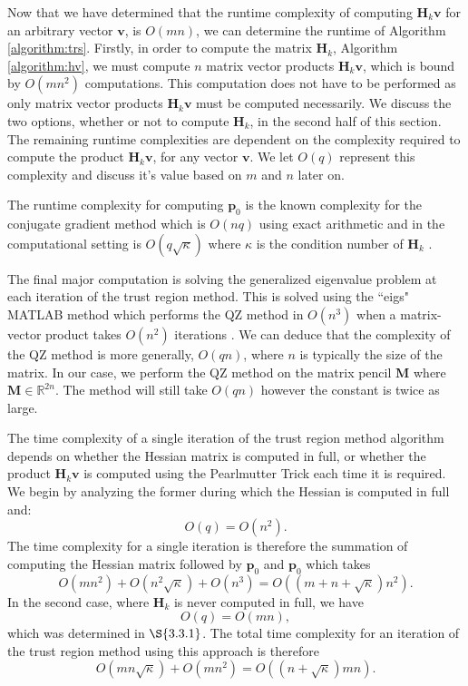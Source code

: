 \documentclass[letterpaper,12pt,titlepage,oneside,final]{book}
\begin{document}
	Now that we have determined that the runtime complexity of computing $\mathbf{H}_{k}\mathbf{v}$ for an arbitrary vector $\mathbf{v}$, is $O(mn)$, we can determine the runtime of Algorithm \ref{algorithm:trs}. Firstly, in order to compute the matrix $\mathbf{H}_{k}$, Algorithm \ref{algorithm:hv}, we must compute $n$ matrix vector products $\mathbf{H}_{k}\mathbf{v}$, which is bound by $O(mn^{2})$ computations. This computation does not have to be performed as only matrix vector products $\mathbf{H}_{k}\mathbf{v}$ must be computed necessarily. We discuss the two options, whether or not to compute $\mathbf{H}_{k}$, in the second half of this section. The remaining runtime complexities are dependent on the complexity required to compute the product $\mathbf{H}_{k}\mathbf{v}$, for any vector $\mathbf{v}$. We let $O(q)$ represent this complexity and discuss it's value based on $m$ and $n$ later on.
	
	The runtime complexity for computing $\mathbf{p}_{0}$ 
	is the known complexity for the conjugate gradient method which is $O(nq)$ using exact arithmetic \cite{strakovs1991real} and in the computational setting is $O(q\sqrt{\kappa})$ where $\kappa$ is the condition number of $\mathbf{H}_{k}$ \cite{shewchuk1994introduction}. 
	
	The final major computation is solving the generalized eigenvalue problem at each iteration of the trust region method. This is solved using the ``eigs" MATLAB method which performs the QZ method in $O(n^{3})$ when a matrix-vector product takes $O(n^2)$ iterations \cite{golub1989matrix}. We can deduce that the complexity of the QZ method is more generally, $O(qn)$, where $n$ is typically the size of the matrix. In our case, we perform the QZ method on the matrix pencil $\mathbf{M}$ where $\mathbf{M} \in \mathbb{R}^{2n}$. The method will still take $O(qn)$ however the constant is twice as large.
	
	The time complexity of a single iteration of the trust region method algorithm depends on whether the Hessian matrix is computed in full, or whether the product $\mathbf{H}_{k}\mathbf{v}$ is computed using the Pearlmutter Trick each time it is required. We begin by analyzing the former during which the Hessian is computed in full and:
	\begin{equation}
	O(q) = O(n^{2}).
	\end{equation}
	The time complexity for a single iteration is therefore the summation of computing the Hessian matrix followed by $\mathbf{p}_{0}$ and $\mathbf{p}_{0}$ which takes 
	\begin{equation}
	O(mn^{2}) + O(n^{2}\sqrt{\kappa}) + O(n^{3}) = O((m+n+\sqrt{\kappa})n^{2}).
	\end{equation}
	In the second case, where $\mathbf{H}_{k}$ is never computed in full, we have 
	\begin{equation}
	O(q) = O(mn),
	\end{equation} 
	which was determined in $\S{3.3.1}$. The total time complexity for an iteration of the trust region method using this approach is therefore
	\begin{equation}
	O(mn\sqrt{\kappa}) + O(mn^{2}) = O((n+\sqrt{\kappa})mn).
	\end{equation}
	
\end{document}
